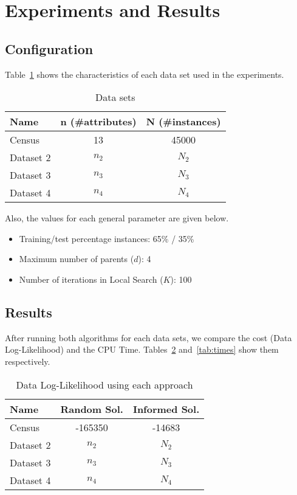 \section{Experiments and Results}
\label{sec:experiments}

\subsection{Configuration}
\label{subsec:configuration}
	Table~\ref{tab:datasets} shows the characteristics of each data set used in the experiments.
	\begin{table}[ h ]
		\centering
		\begin{tabular}{ | l | c | c | }
			\hline
			Name & n (\#attributes) & N (\#instances) \\ \hline
			Census & 13 & 45000 \\ \hline
			Dataset 2 & $n_2$ & $N_2$ \\ \hline
			Dataset 3 & $n_3$ & $N_3$ \\ \hline
			Dataset 4 & $n_4$ & $N_4$ \\ \hline
		\end{tabular}
		\caption{Data sets}
		\label{tab:datasets}
	\end{table}
	
	Also, the values for each general parameter are given below.
	\begin{itemize}
		\item Training/test percentage instances: 65\% / 35\%
		\item Maximum number of parents ($d$): 4
		\item Number of iterations in Local Search ($K$): 100
	\end{itemize}

\subsection{Results}
\label{subsec:results}
	After running both algorithms for each data sets, we compare the cost (Data Log-Likelihood) and the CPU Time. Tables~\ref{tab:costs} and~\ref{tab:times} show them respectively.
	\begin{table}[ h ]
		\centering
		\begin{tabular}{ | l | c | c | }
			\hline
			Name & Random Sol. & Informed Sol. \\ \hline
			Census & -165350 & -14683 \\ \hline
			Dataset 2 & $n_2$ & $N_2$ \\ \hline
			Dataset 3 & $n_3$ & $N_3$ \\ \hline
			Dataset 4 & $n_4$ & $N_4$ \\ \hline
		\end{tabular}
		\caption{Data Log-Likelihood using each approach}
		\label{tab:costs}
	\end{table}
	
